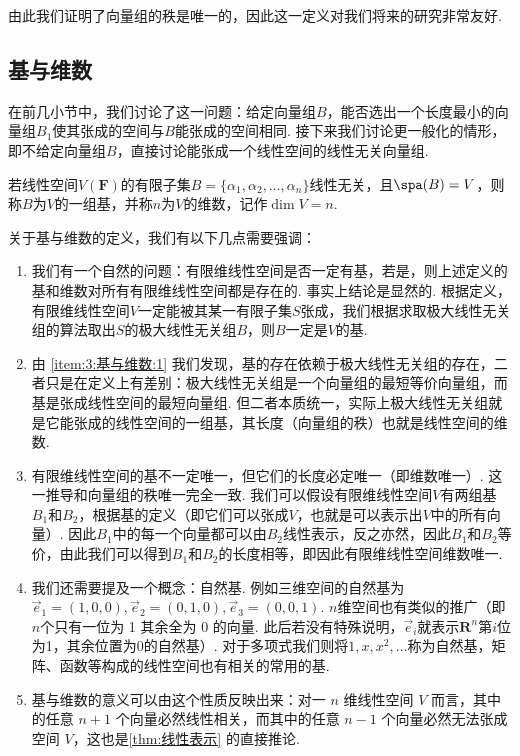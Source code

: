 由此我们证明了向量组的秩是唯一的，因此这一定义对我们将来的研究非常友好.

\subsection{基与维数}

在前几小节中，我们讨论了这一问题：给定向量组$B$，能否选出一个长度最小的向量组$B_1$使其张成的空间与$B$能张成的空间相同. 接下来我们讨论更一般化的情形，即不给定向量组$B$，直接讨论能张成一个线性空间的线性无关向量组.
\begin{definition}{}{}
    若线性空间$V(\mathbf{F})$的有限子集$B=\{\alpha_1,\alpha_2,\ldots,\alpha_n\}$线性无关，且$\spa(B) = V$，则称$B$为$V$的一组基，并称$n$为$V$的维数，记作$\dim V = n$.
\end{definition}

关于基与维数的定义，我们有以下几点需要强调：
\begin{enumerate}
    \item \label{item:3:基与维数:1}
          我们有一个自然的问题：有限维线性空间是否一定有基，若是，则上述定义的基和维数对所有有限维线性空间都是存在的. 事实上结论是显然的. 根据定义，有限维线性空间$V$一定能被其某一有限子集$S$张成，我们根据求取极大线性无关组的算法取出$S$的极大线性无关组$B$，则$B$一定是$V$的基.

    \item 由 \ref*{item:3:基与维数:1} 我们发现，基的存在依赖于极大线性无关组的存在，二者只是在定义上有差别：极大线性无关组是一个向量组的最短等价向量组，而基是张成线性空间的最短向量组. 但二者本质统一，实际上极大线性无关组就是它能张成的线性空间的一组基，其长度（向量组的秩）也就是线性空间的维数.

    \item 有限维线性空间的基不一定唯一，但它们的长度必定唯一（即维数唯一）. 这一推导和向量组的秩唯一完全一致. 我们可以假设有限维线性空间$V$有两组基$B_1$和$B_2$，根据基的定义（即它们可以张成$V$，也就是可以表示出$V$中的所有向量）. 因此$B_1$中的每一个向量都可以由$B_2$线性表示，反之亦然，因此$B_1$和$B_2$等价，由此我们可以得到$B_1$和$B_2$的长度相等，即因此有限维线性空间维数唯一.

    \item 我们还需要提及一个概念：自然基. 例如三维空间的自然基为$\vec{e}_1=(1,0,0),\vec{e}_2=(0,1,0),\vec{e}_3=(0,0,1)$. $n$维空间也有类似的推广（即$n$个只有一位为 1 其余全为 0 的向量. 此后若没有特殊说明，$\vec{e}_i$就表示$\mathbf{R}^n$第$i$位为1，其余位置为0的自然基）. 对于多项式我们则将$1,x,x^2,\ldots$称为自然基，矩阵、函数等构成的线性空间也有相关的常用的基.

    \item \label{item:3:基与维数:5}
          基与维数的意义可以由这个性质反映出来：对一 $n$ 维线性空间 $V$ 而言，其中的任意 $n + 1$ 个向量必然线性相关，而其中的任意 $n - 1$ 个向量必然无法张成空间 $V$，这也是\autoref{thm:线性表示} 的直接推论.
\end{enumerate}

